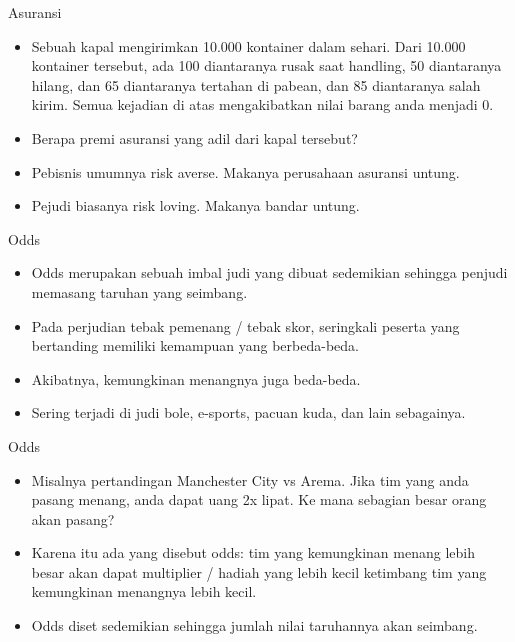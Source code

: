 \documentclass[
  ignorenonframetext,
]{beamer}
\begin{document}
\begin{frame}{Asuransi}
\label{asuransi-2}
\begin{itemize}[<+->]
\item
  Sebuah kapal mengirimkan 10.000 kontainer dalam sehari. Dari 10.000
  kontainer tersebut, ada 100 diantaranya rusak saat handling, 50
  diantaranya hilang, dan 65 diantaranya tertahan di pabean, dan 85
  diantaranya salah kirim. Semua kejadian di atas mengakibatkan nilai
  barang anda menjadi 0.
\item
  Berapa premi asuransi yang adil dari kapal tersebut?
\item
  Pebisnis umumnya risk averse. Makanya perusahaan asuransi untung.
\item
  Pejudi biasanya risk loving. Makanya bandar untung.
\end{itemize}
\end{frame}

\begin{frame}{Odds}
\label{odds}
\begin{itemize}
\item
  Odds merupakan sebuah imbal judi yang dibuat sedemikian sehingga
  penjudi memasang taruhan yang seimbang.
\item
  Pada perjudian tebak pemenang / tebak skor, seringkali peserta yang
  bertanding memiliki kemampuan yang berbeda-beda.
\item
  Akibatnya, kemungkinan menangnya juga beda-beda.
\item
  Sering terjadi di judi bole, e-sports, pacuan kuda, dan lain
  sebagainya.
\end{itemize}
\end{frame}

\begin{frame}{Odds}
\label{odds-1}
\begin{itemize}
\item
  Misalnya pertandingan Manchester City vs Arema. Jika tim yang anda
  pasang menang, anda dapat uang 2x lipat. Ke mana sebagian besar orang
  akan pasang?
\item
  Karena itu ada yang disebut odds: tim yang kemungkinan menang lebih
  besar akan dapat multiplier / hadiah yang lebih kecil ketimbang tim
  yang kemungkinan menangnya lebih kecil.
\item
  Odds diset sedemikian sehingga jumlah nilai taruhannya akan seimbang.
\end{itemize}
\end{frame}
\end{document}
